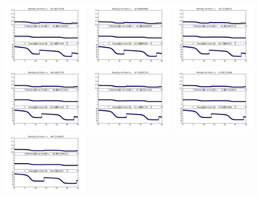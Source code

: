 \documentclass[11pt]{article}
\begin{document}
\vskip 10pt 
\includegraphics[width=0.316666666667\textwidth]{frame0062fig1.png}
\vskip 10pt 
\includegraphics[width=0.316666666667\textwidth]{frame0063fig1.png}
\vskip 10pt 
\includegraphics[width=0.316666666667\textwidth]{frame0064fig1.png}
\vskip 10pt 
\includegraphics[width=0.316666666667\textwidth]{frame0065fig1.png}
\vskip 10pt 
\includegraphics[width=0.316666666667\textwidth]{frame0066fig1.png}
\vskip 10pt 
\includegraphics[width=0.316666666667\textwidth]{frame0067fig1.png}
\vskip 10pt 
\includegraphics[width=0.316666666667\textwidth]{frame0068fig1.png}
\end{document}
